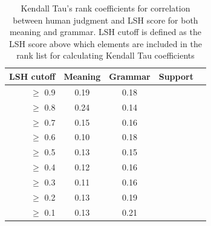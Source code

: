 \documentclass[11pt]{article}
\begin{document}




\begin{table}%
\begin{center}
\begin{tabular}{rcccc}%
\hline \hline
\bf \scriptsize LSH cutoff & \bf \scriptsize Meaning & \bf \scriptsize Grammar & \bf \scriptsize Support \\ \hline
{\scriptsize $\geq$ 0.9} & {\scriptsize 0.19} & {\scriptsize 0.18} & {\scriptsize }  \\
{\scriptsize $\geq$ 0.8} & {\scriptsize 0.24} & {\scriptsize 0.14} & {\scriptsize }  \\
{\scriptsize $\geq$ 0.7} & {\scriptsize 0.15} & {\scriptsize 0.16} & {\scriptsize }  \\
{\scriptsize $\geq$ 0.6} & {\scriptsize 0.10} & {\scriptsize 0.18} & {\scriptsize }  \\
{\scriptsize $\geq$ 0.5} & {\scriptsize 0.13} & {\scriptsize 0.15} & {\scriptsize }  \\
{\scriptsize $\geq$ 0.4} & {\scriptsize 0.12 } & {\scriptsize 0.16} & {\scriptsize }  \\
{\scriptsize $\geq$ 0.3} & {\scriptsize 0.11} & {\scriptsize 0.16} & {\scriptsize }  \\
{\scriptsize $\geq$ 0.2} & {\scriptsize 0.13} & {\scriptsize 0.19} & {\scriptsize }  \\
{\scriptsize $\geq$ 0.1} & {\scriptsize 0.13} & {\scriptsize 0.21} & {\scriptsize }  \\
\hline
\end{tabular}
\end{center}
\caption{\label{table8} Kendall Tau's rank coefficients for correlation between human judgment and LSH score for both meaning and grammar. LSH cutoff is defined as the LSH score above which elements are included in the rank list for calculating Kendall Tau coefficients}
\end{table}


\end{document}
